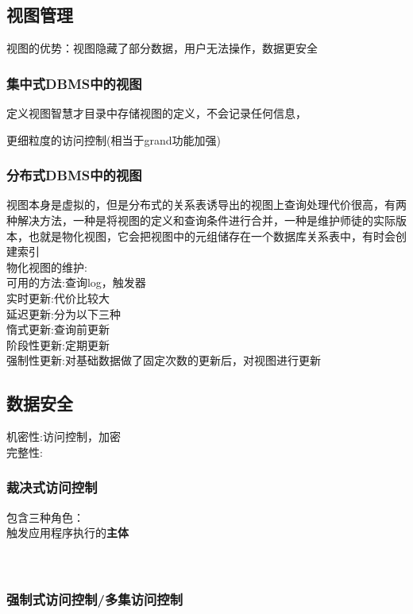 \documentclass{article}
\begin{document}
\begin{CJK}{UTF8}{gbsn}
	\subsection*{视图管理}
	视图的优势：视图隐藏了部分数据，用户无法操作，数据更安全\\
	
	\subsubsection*{集中式DBMS中的视图}
	定义视图智慧才目录中存储视图的定义，不会记录任何信息，
	
	更细粒度的访问控制(相当于grand功能加强)\\
	
	\subsubsection*{分布式DBMS中的视图}
	视图本身是虚拟的，但是分布式的关系表诱导出的视图上查询处理代价很高，有两种解决方法，一种是将视图的定义和查询条件进行合并，一种是维护师徒的实际版本，也就是物化视图，它会把视图中的元组储存在一个数据库关系表中，有时会创建索引\\
	物化视图的维护:\\
	可用的方法:查询log，触发器\\
	实时更新:代价比较大\\
	延迟更新:分为以下三种\\
	惰式更新:查询前更新\\
	阶段性更新:定期更新\\
	强制性更新:对基础数据做了固定次数的更新后，对视图进行更新\\
	\subsection*{数据安全}
	机密性:访问控制，加密\\
	完整性:\\
	
	\subsubsection*{裁决式访问控制}
	包含三种角色：\\
	触发应用程序执行的\textbf{主体}\\
	\\
	\\
	\subsubsection*{强制式访问控制/多集访问控制}
	

\end{CJK}
\end{document}
